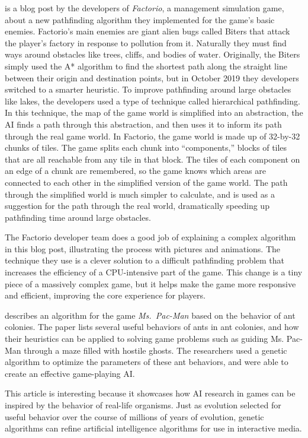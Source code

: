 \documentclass[a4paper, 10pt, american]{article}
\begin{document}
\vspace{10pt}

\cite{factorio2019} is a blog post by the developers of \textit{Factorio}, a
management simulation game, about a new pathfinding algorithm they implemented
for the game's basic enemies. Factorio's main enemies are giant alien bugs
called Biters that attack the player's factory in response to pollution from it.
Naturally they must find ways around obstacles like trees, cliffs, and bodies of
water. Originally, the Biters simply used the A* algorithm to find the shortest
path along the straight line between their origin and destination points, but in
October 2019 they developers switched to a smarter heuristic. To improve
pathfinding around large obstacles like lakes, the developers used a type of
technique called hierarchical pathfinding. In this technique, the map of the
game world is simplified into an abstraction, the AI finds a path through this
abstraction, and then uses it to inform its path through the real game world. In
Factorio, the game world is made up of 32-by-32 chunks of tiles. The game splits
each chunk into ``components,'' blocks of tiles that are all reachable from any
tile in that block. The tiles of each component on an edge of a chunk are
remembered, so the game knows which areas are connected to each other in the
simplified version of the game world. The path through the simplified world is
much simpler to calculate, and is used as a suggestion for the path through the
real world, dramatically speeding up pathfinding time around large obstacles.

The Factorio developer team does a good job of explaining a complex algorithm in
this blog post, illustrating the process with pictures and animations. The
technique they use is a clever solution to a difficult pathfinding problem that
increases the efficiency of a CPU-intensive part of the game. This change is a
tiny piece of a massively complex game, but it helps make the game more
responsive and efficient, improving the core experience for players.

\vspace{10pt}

\cite{emilio2010pac} describes an algorithm for the game \textit{Ms.~Pac-Man}
based on the behavior of ant colonies. The paper lists several useful behaviors
of ants in ant colonies, and how their heuristics can be applied to solving game
problems such as guiding Ms. Pac-Man through a maze filled with hostile ghosts.
The researchers used a genetic algorithm to optimize the parameters of these ant
behaviors, and were able to create an effective game-playing AI.

This article is interesting because it showcases how AI research in games can be
inspired by the behavior of real-life organisms. Just as evolution selected for
useful behavior over the course of millions of years of evolution, genetic
algorithms can refine artificial intelligence algorithms for use in interactive
media.



\end{document}
